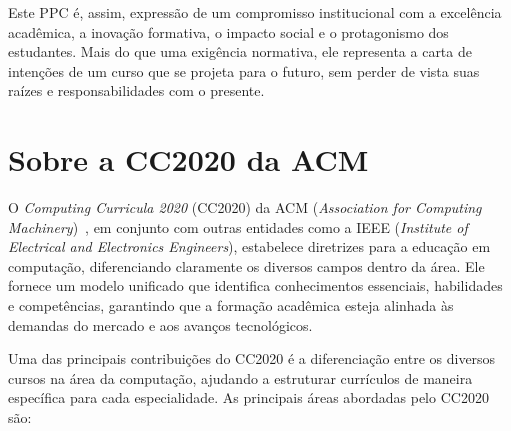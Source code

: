 Este PPC é, assim, expressão de um compromisso institucional com a excelência acadêmica, a inovação formativa, o impacto social e o protagonismo dos estudantes. Mais do que uma exigência normativa, ele representa a carta de intenções de um curso que se projeta para o futuro, sem perder de vista suas raízes e responsabilidades com o presente.

\chapter{Sobre a CC2020 da ACM}
\label{chp:apresentacao_acm}

O \textit{Computing Curricula 2020} (CC2020) da ACM (\textit{Association for Computing Machinery})~\cite{ACM:CC2020}, em conjunto com outras entidades como a IEEE (\textit{Institute of Electrical and Electronics Engineers}), estabelece diretrizes para a educação em computação, diferenciando claramente os diversos campos dentro da área. Ele fornece um modelo unificado que identifica conhecimentos essenciais, habilidades e competências, garantindo que a formação acadêmica esteja alinhada às demandas do mercado e aos avanços tecnológicos.

Uma das principais contribuições do CC2020 é a diferenciação entre os diversos cursos na área da computação, ajudando a estruturar currículos de maneira específica para cada especialidade. As principais áreas abordadas pelo CC2020 são:

